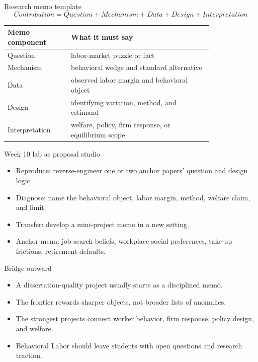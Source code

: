\documentclass[aspectratio=169,11pt]{beamer}
\begin{document}
\begin{frame}{Research memo template}
\[
Contribution = Question + Mechanism + Data + Design + Interpretation
\]

\small
\begin{tabular}{p{0.25\linewidth} p{0.56\linewidth}}
\toprule
Memo component & What it must say \\
\midrule
Question & labor-market puzzle or fact \\
Mechanism & behavioral wedge and standard alternative \\
Data & observed labor margin and behavioral object \\
Design & identifying variation, method, and estimand \\
Interpretation & welfare, policy, firm response, or equilibrium scope \\
\bottomrule
\end{tabular}
\end{frame}

\begin{frame}{Week 10 lab as proposal studio}
\begin{itemize}
    \item Reproduce: reverse-engineer one or two anchor papers' question and design logic.
    \item Diagnose: name the behavioral object, labor margin, method, welfare claim, and limit.
    \item Transfer: develop a mini-project memo in a new setting.
    \item Anchor menu: job-search beliefs, workplace social preferences, take-up frictions, retirement defaults.
\end{itemize}
\end{frame}

\begin{frame}{Bridge outward}
\begin{itemize}
    \item A dissertation-quality project usually starts as a disciplined memo.
    \item The frontier rewards sharper objects, not broader lists of anomalies.
    \item The strongest projects connect worker behavior, firm response, policy design, and welfare.
    \item Behavioral Labor should leave students with open questions and research traction.
\end{itemize}
\end{frame}
\end{document}
